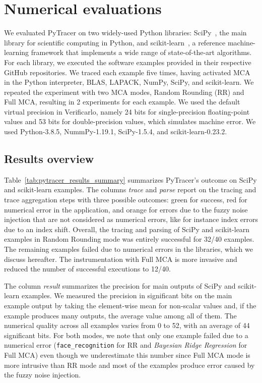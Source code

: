 \documentclass[11pt]{article}
\newcommand{\tristan}[1]{\color{orange}\textbf{From Tristan:} #1\color{black}\xspace}
\newcommand{\pytracer}[0]{PyTracer\xspace}
\begin{document}
\section{Numerical evaluations}

We evaluated \pytracer on two widely-used Python libraries: SciPy~\cite{virtanen2020scipy}, the main library for scientific computing in Python, and  scikit-learn~\cite{pedregosa2011scikit}, a reference machine-learning framework that
 implements a wide range of state-of-the-art algorithms. For each library, we executed the software examples provided in their respective GitHub repositories. We traced each example five times, having activated MCA in the Python interpreter, BLAS, LAPACK, NumPy, SciPy, and scikit-learn. We repeated the experiment with two MCA modes, Random Rounding (RR) and Full MCA, resulting in 2 experiments for each example. We used the default virtual precision in Verificarlo, namely 24 bits for single-precision floating-point values and 53 bits for double-precision values, which simulates machine error. We used Python-3.8.5, NummPy-1.19.1, SciPy-1.5.4, and scikit-learn-0.23.2.

\subsection{Results overview}

Table~\ref{tab:pytracer_results_summary} summarizes
\pytracer's outcome on SciPy and scikit-learn examples.
The columns \textit{trace} and \textit{parse} report on the tracing and trace aggregation steps with three possible outcomes: green for success, red for numerical error in the application, and orange for errors due to the fuzzy noise injection
that are not considered as numerical errors, like for instance index errors due to an index shift.
Overall, the tracing and parsing of SciPy and scikit-learn examples in Random Rounding mode was entirely successful for 32/40 examples. The remaining examples failed due to numerical errors in the libraries, which we discuss hereafter. The instrumentation with Full MCA is more invasive and reduced the number of successful executions to 12/40.

The column \textit{result} summarizes the precision for main outputs of SciPy and scikit-learn examples. 
We measured the precision in significant bits on the main example output by taking the element-wise mean for non-scalar values and, if the example produces many outputs, the average value among all of them. The numerical quality across all examples varies from 0 to 52, with an average of 44 significant bits. For both modes, we note that only one example failed due to a numerical error 
(\texttt{face\_recognition} for RR and \textit{Bayesian Ridge Regression} for Full MCA) even though we underestimate this number since Full MCA mode is more intrusive than RR mode and most of the examples produce error caused by the fuzzy noise injection. 
\end{document}
